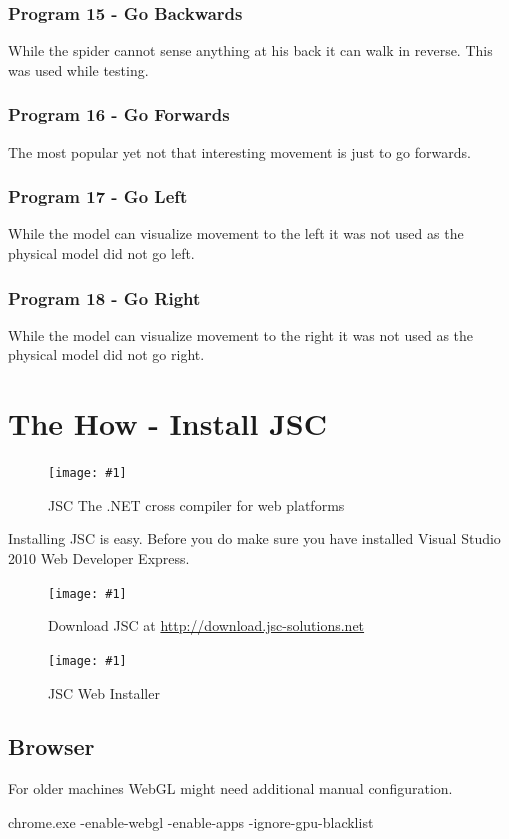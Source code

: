 \documentclass[12pt,leqno]{book}
\newcommand{\png}[1]{\texttt{[image: \#1]}}
\newcommand{\figpng}[2]{\begin{figure}[htb]\centering\png{#1}\caption{#2}\end{figure}}
\begin{document}
\subsection{Program 15 - Go Backwards}
While the spider cannot sense anything at his back it can walk in reverse. This was used while testing.
\subsection{Program 16 - Go Forwards}
The most popular yet not that interesting movement is just to go forwards.
\subsection{Program 17 - Go Left}
While the model can visualize movement to the left it was not used as the physical model did not go left.
\subsection{Program 18 - Go Right}
While the model can visualize movement to the right it was not used as the physical model did not go right.








\chapter{The How - Install JSC}

\figpng{Images/jscpromotion1}
{JSC The .NET cross compiler for web platforms}

Installing JSC is easy. Before you do make sure you have installed Visual Studio 2010 Web Developer Express.

\figpng{Images/jsc_-_Google_Chrome-2012-03-14_14.33.04}
{Download JSC at \url{http://download.jsc-solutions.net}}

\figpng{Images/jsc-2012-03-14_14.45.41}
{JSC Web Installer}






\section{Browser}

For older machines WebGL might need additional manual configuration.

\begin{framed}
chrome.exe -enable-webgl -enable-apps -ignore-gpu-blacklist
\end{framed}
\end{document}
